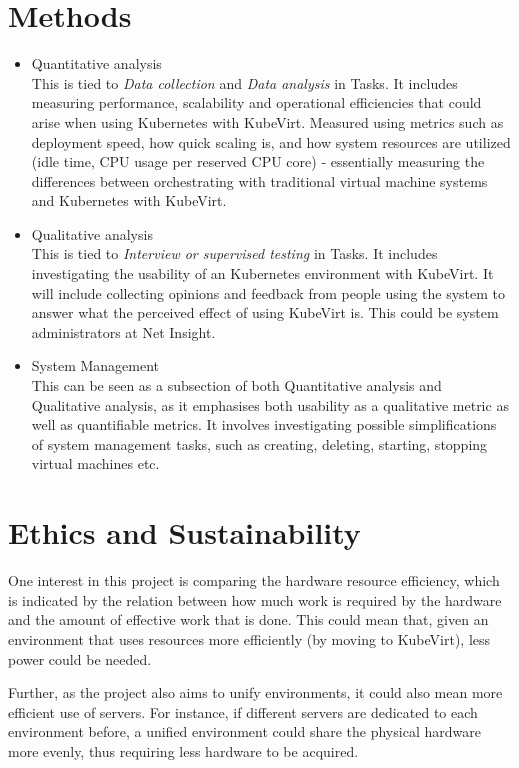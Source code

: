 \documentclass{article}
\begin{document}
\section{Methods}
\begin{itemize}
    \item Quantitative analysis\\
    This is tied to \textit{Data collection} and \textit{Data analysis} in Tasks. It includes measuring performance, scalability and operational efficiencies that could arise when using Kubernetes with KubeVirt. Measured using metrics such as deployment speed, how quick scaling is, and how system resources are utilized (idle time, CPU usage per reserved CPU core) - essentially measuring the differences between orchestrating with traditional virtual machine systems and Kubernetes with KubeVirt. 
    \item Qualitative analysis\\
    This is tied to \textit{Interview or supervised testing} in Tasks. It includes investigating the usability of an Kubernetes environment with KubeVirt. It will include collecting opinions and feedback from people using the system to answer what the perceived effect of using KubeVirt is. This could be system administrators at Net Insight.
    \item System Management\\
    This can be seen as a subsection of both Quantitative analysis and Qualitative analysis, as it emphasises both usability as a qualitative metric as well as quantifiable metrics. It involves investigating possible simplifications of system management tasks, such as creating, deleting, starting, stopping virtual machines etc.
\end{itemize}

\section{Ethics and Sustainability}
One interest in this project is comparing the hardware resource efficiency, which is indicated by the relation between how much work is required by the hardware and the amount of effective work that is done. This could mean that, given an environment that uses resources more efficiently (by moving to KubeVirt), less power could be needed.

Further, as the project also aims to unify environments, it could also mean more efficient use of servers. For instance, if different servers are dedicated to each environment before, a unified environment could share the physical hardware more evenly, thus requiring less hardware to be acquired. 
\end{document}
